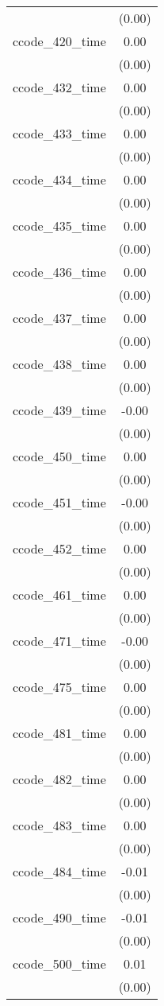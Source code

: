 {\begin{tabular}{@{\extracolsep{2pt}}l*{1}{c}@{}}
 & (0.00) \\
ccode\_420\_time & 0.00 \\
 & (0.00) \\
ccode\_432\_time & 0.00 \\
 & (0.00) \\
ccode\_433\_time & 0.00 \\
 & (0.00) \\
ccode\_434\_time & 0.00 \\
 & (0.00) \\
ccode\_435\_time & 0.00 \\
 & (0.00) \\
ccode\_436\_time & 0.00 \\
 & (0.00) \\
ccode\_437\_time & 0.00 \\
 & (0.00) \\
ccode\_438\_time & 0.00 \\
 & (0.00) \\
ccode\_439\_time & -0.00 \\
 & (0.00) \\
ccode\_450\_time & 0.00 \\
 & (0.00) \\
ccode\_451\_time & -0.00 \\
 & (0.00) \\
ccode\_452\_time & 0.00 \\
 & (0.00) \\
ccode\_461\_time & 0.00 \\
 & (0.00) \\
ccode\_471\_time & -0.00 \\
 & (0.00) \\
ccode\_475\_time & 0.00 \\
 & (0.00) \\
ccode\_481\_time & 0.00 \\
 & (0.00) \\
ccode\_482\_time & 0.00 \\
 & (0.00) \\
ccode\_483\_time & 0.00 \\
 & (0.00) \\
ccode\_484\_time & -0.01\sym{*} \\
 & (0.00) \\
ccode\_490\_time & -0.01\sym{+} \\
 & (0.00) \\
ccode\_500\_time & 0.01\sym{**} \\
 & (0.00) \\

\end{tabular}}
